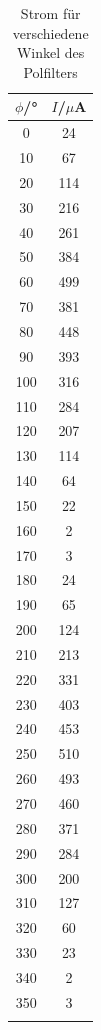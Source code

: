 \begin{longtable}[H]{c c}
			\toprule
			\(\phi\)/° & \(I\)/\(\mu\)A \\
			\midrule
			0       &24\\
			10      &67\\
			20      &114\\
			30      &216\\
			40      &261\\
			50      &384\\
			60      &499\\
			70      &381\\
			80      &448\\
			90      &393\\
			100     &316\\
			110     &284\\
			120     &207\\
			130     &114\\
			140     &64\\
			150     &22\\
			160     &2\\
			170     &3\\
			180     &24\\
			190     &65\\
			200     &124\\
			210     &213\\
			220     &331\\
			230     &403\\
			240     &453\\
			250     &510\\
			260     &493\\
			270     &460\\
			280     &371\\
			290     &284\\
			300     &200\\
			310     &127\\
			320     &60\\
			330     &23  \\                                                                                            
			340     &2      \\                                                                                         
			350     &3  	\\
			\bottomrule
		\caption{Strom für verschiedene Winkel des Polfilters}
		\label{tab:t4}
\end{longtable}

